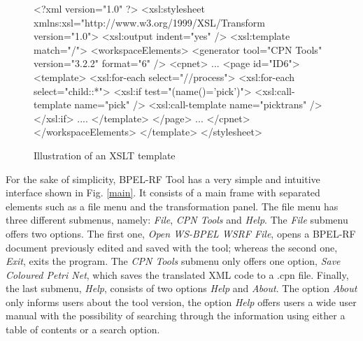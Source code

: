 \begin{figure}[!ht]
\begin{center}
\scriptsize
\begin{boxedverbatim}
<?xml version="1.0" ?>
<xsl:stylesheet
 xmlns:xsl="http://www.w3.org/1999/XSL/Transform 
version="1.0">
<xsl:output indent="yes" />
<xsl:template match="/">
<workspaceElements>
<generator tool="CPN Tools" version="3.2.2" format="6" />
<cpnet>
...
<page id="ID6">
<template>
<xsl:for-each select="//process">
<xsl:for-each select="child::*">
<xsl:if test="(name()='pick')">
<xsl:call-template name="pick" />
<xsl:call-template name="picktrans" />
</xsl:if>
....
</template>
</page>
...
</cpnet>
</workspaceElements>
</template>
</stylesheet>
	
\end{boxedverbatim}
\end{center}
\vspace{-0.4cm}
\caption{Illustration of an XSLT template}\label{example1}
\end{figure}
For the sake of simplicity, BPEL-RF Tool has a very simple and intuitive interface
shown in Fig. \ref{main}. It consists of a main frame with separated elements such as a file menu and the transformation panel. The file menu has three different submenus, namely: \emph{File},  \emph{CPN Tools} and \emph{Help}. The \emph{File} submenu offers two options. The first one, \emph{Open WS-BPEL WSRF File}, opens a BPEL-RF document previously edited and saved with the tool; whereas the second one, \emph{Exit}, exits the program. The
\emph{CPN Tools} submenu only offers one option, \emph{Save Coloured Petri Net}, which
saves the translated XML code to a .cpn file. Finally, the last submenu, \emph{Help}, consists of two options \emph{Help} and \emph{About}. The option \emph{About} only informs users about the tool version, the option \emph{Help} offers users a wide user manual with the possibility of searching through the information using either a table of contents or a 
search option. 

